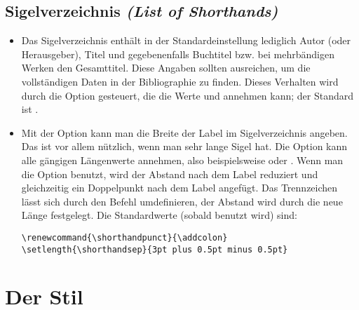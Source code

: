 \documentclass[ngerman]{scrartcl}
\begin{document}
\subsection[Sigelverzeichnis]{Sigelverzeichnis \emph{(List of Shorthands)}}
\begin{itemize}
	\item Das
	      Sigelverzeichnis enthält in der Standardeinstellung lediglich 
	      Autor (oder Herausgeber), Titel und gegebenenfalls Buchtitel bzw. bei 
	      mehrbändigen Werken den Gesamttitel. Diese Angaben sollten ausreichen, 
	      um die vollständigen Daten in der Bibliographie zu finden. Dieses
	      Verhalten wird durch die Option  gesteuert, die
	      die Werte  und  annehmen kann; der Standard
	      ist .
	\item Mit
	      der Option  kann man die Breite der Label
	      im Sigelverzeichnis angeben. Das ist vor allem nützlich, wenn man sehr
	      lange Sigel hat. Die Option kann alle gängigen Längenwerte annehmen,
	      also beispielsweise \wert{40pt} oder \wert{3em}. \achtung Wenn man die 
	      Option  benutzt, wird der Abstand nach dem Label
	      reduziert und gleichzeitig ein Doppelpunkt nach dem Label angefügt. 
	      Das Trennzeichen lässt sich durch den Befehl  
	      umdefinieren, der Abstand wird durch die neue Länge 
	      festgelegt. Die Standardwerte (sobald  benutzt
	      wird) sind:
				\begin{lstlisting}
\renewcommand{\shorthandpunct}{\addcolon}
\setlength{\shorthandsep}{3pt plus 0.5pt minus 0.5pt}
				\end{lstlisting}
\end{itemize}

\section{Der Stil }
\end{document}
